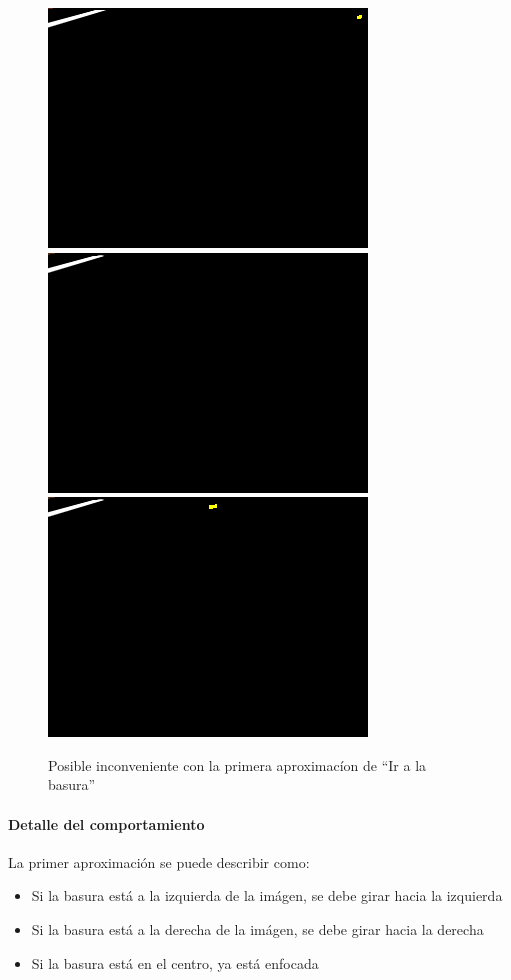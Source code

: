 \begin{figure}[htp]
\begin{center}
\includegraphics[scale=0.3]{comportamientos/esquina.png}
\includegraphics[scale=0.3]{comportamientos/frentemuylejos.png}
\includegraphics[scale=0.3]{comportamientos/frentelejos.png}
\caption{Posible inconveniente con la primera aproximac\'ion de
				``Ir a la basura''}
\label{fig:papproachgotoproblem}
\end{center}
\end{figure}

\paragraph{Detalle del comportamiento}
La primer aproximaci\'on se puede describir como:
\begin{itemize}
\item Si la basura est\'a a la izquierda de la im\'agen, se debe girar hacia la
			izquierda
\item Si la basura est\'a a la derecha de la im\'agen, se debe girar hacia la
			derecha
\item Si la basura est\'a en el centro, ya est\'a enfocada
\end{itemize}

